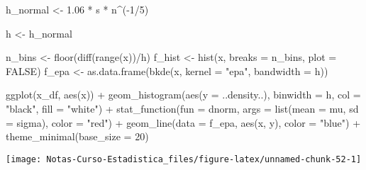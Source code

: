 \documentclass[
  12pt,
]{book}
\newenvironment{Shaded}{\begin{snugshade}}{\end{snugshade}}
\newcommand{\AttributeTok}[1]{\textcolor[rgb]{0.77,0.63,0.00}{#1}}
\newcommand{\ConstantTok}[1]{\textcolor[rgb]{0.00,0.00,0.00}{#1}}
\newcommand{\DecValTok}[1]{\textcolor[rgb]{0.00,0.00,0.81}{#1}}
\newcommand{\FloatTok}[1]{\textcolor[rgb]{0.00,0.00,0.81}{#1}}
\newcommand{\FunctionTok}[1]{\textcolor[rgb]{0.00,0.00,0.00}{#1}}
\newcommand{\NormalTok}[1]{#1}
\newcommand{\OtherTok}[1]{\textcolor[rgb]{0.56,0.35,0.01}{#1}}
\newcommand{\SpecialCharTok}[1]{\textcolor[rgb]{0.00,0.00,0.00}{#1}}
\newcommand{\StringTok}[1]{\textcolor[rgb]{0.31,0.60,0.02}{#1}}
\theoremstyle{definition}
\theoremstyle{definition}
\theoremstyle{definition}
\theoremstyle{definition}
\theoremstyle{remark}
\begin{document}
\begin{Shaded}
\begin{Highlighting}[]
\NormalTok{h\_normal }\OtherTok{\textless{}{-}} \FloatTok{1.06} \SpecialCharTok{*}\NormalTok{ s }\SpecialCharTok{*}\NormalTok{ n}\SpecialCharTok{\^{}}\NormalTok{(}\SpecialCharTok{{-}}\DecValTok{1}\SpecialCharTok{/}\DecValTok{5}\NormalTok{)}

\NormalTok{h }\OtherTok{\textless{}{-}}\NormalTok{ h\_normal}

\NormalTok{n\_bins }\OtherTok{\textless{}{-}} \FunctionTok{floor}\NormalTok{(}\FunctionTok{diff}\NormalTok{(}\FunctionTok{range}\NormalTok{(x))}\SpecialCharTok{/}\NormalTok{h)}
\NormalTok{f\_hist }\OtherTok{\textless{}{-}} \FunctionTok{hist}\NormalTok{(x, }\AttributeTok{breaks =}\NormalTok{ n\_bins, }\AttributeTok{plot =} \ConstantTok{FALSE}\NormalTok{)}
\NormalTok{f\_epa }\OtherTok{\textless{}{-}} \FunctionTok{as.data.frame}\NormalTok{(}\FunctionTok{bkde}\NormalTok{(x, }\AttributeTok{kernel =} \StringTok{"epa"}\NormalTok{, }\AttributeTok{bandwidth =}\NormalTok{ h))}

\FunctionTok{ggplot}\NormalTok{(x\_df, }\FunctionTok{aes}\NormalTok{(x)) }\SpecialCharTok{+} \FunctionTok{geom\_histogram}\NormalTok{(}\FunctionTok{aes}\NormalTok{(}\AttributeTok{y =}\NormalTok{ ..density..),}
    \AttributeTok{binwidth =}\NormalTok{ h, }\AttributeTok{col =} \StringTok{"black"}\NormalTok{, }\AttributeTok{fill =} \StringTok{"white"}\NormalTok{) }\SpecialCharTok{+}
    \FunctionTok{stat\_function}\NormalTok{(}\AttributeTok{fun =}\NormalTok{ dnorm, }\AttributeTok{args =} \FunctionTok{list}\NormalTok{(}\AttributeTok{mean =}\NormalTok{ mu,}
        \AttributeTok{sd =}\NormalTok{ sigma), }\AttributeTok{color =} \StringTok{"red"}\NormalTok{) }\SpecialCharTok{+} \FunctionTok{geom\_line}\NormalTok{(}\AttributeTok{data =}\NormalTok{ f\_epa,}
    \FunctionTok{aes}\NormalTok{(x, y), }\AttributeTok{color =} \StringTok{"blue"}\NormalTok{) }\SpecialCharTok{+} \FunctionTok{theme\_minimal}\NormalTok{(}\AttributeTok{base\_size =} \DecValTok{20}\NormalTok{)}
\end{Highlighting}
\end{Shaded}

\begin{center}\texttt{[image: Notas-Curso-Estadistica\_files/figure-latex/unnamed-chunk-52-1]} \end{center}
\end{document}
